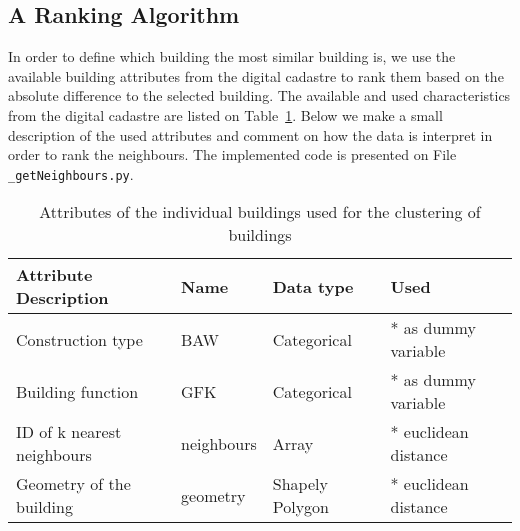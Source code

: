 \subsection{A Ranking Algorithm}

In order to define which building the most similar building is, we use the
available building attributes from the digital cadastre to rank them based on
the absolute difference to the selected building.
%
The available and used characteristics from the digital cadastre are listed on
Table~\ref{tab:attributes}. Below we make a small description of the used
attributes and comment on how the data is interpret in order to rank the
neighbours.
%
The implemented code is presented on File \verb|_getNeighbours.py|.
\\

\begin{table}[htb]
    \centering
    \caption{Attributes of the individual buildings used for the clustering of
    buildings}\label{tab:attributes}
    \begin{tabular}{llll}
        \toprule
        \textbf{Attribute Description} & \textbf{Name} & \textbf{Data
        type} & \textbf{Used}\\
        \midrule
        Construction type             & BAW         & Categorical     & * as dummy variable\\
        Building function             & GFK         & Categorical     & * as dummy variable\\
        ID of k nearest neighbours    & neighbours  & Array           & * euclidean distance\\
        Geometry of the building      & geometry    & Shapely Polygon & * euclidean distance\\
        \bottomrule
    \end{tabular}
\end{table}

